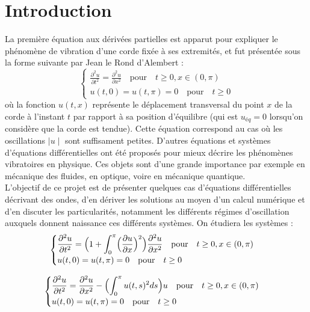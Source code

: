\documentclass[10pt,a4paper]{article}
\begin{document}
\section{Introduction}
La première équation aux dérivées partielles est apparut pour expliquer le phénomène de vibration d'une corde fixée à ses extremités, et fut présentée sous la forme suivante par Jean le Rond d'Alembert :
\begin{equation} \label{Ondes} 
\begin{cases} 
\displaystyle \frac {\partial ^2 u } {\partial t ^2} = \frac {\partial ^2 u } {\partial x ^2}  \quad  \text{pour}\quad t\ge 0, x\in (0,\pi ) \\ u(t, 0)= u (t, \pi )= 0\quad  \text{pour} \quad t\ge 0
\end{cases} 
\end{equation} 
où la fonction $u(t, x)$ représente le déplacement transversal du point $x$ de la corde à l'instant $t$ par rapport à sa position d'équilibre (qui est $u_{éq} = 0$ lorsqu'on considère que la corde est tendue). Cette équation correspond au cas où les oscillations $\mid u\mid$ sont suffisament petites.
D'autres équations et systèmes d'équations différentielles ont été proposés pour mieux décrire les phénomènes vibratoires en physique. Ces objets sont d'une grande importance par exemple en mécanique des fluides, en optique, voire en mécanique quantique.\\
L'objectif de ce projet est de présenter quelques cas d'équations différentielles décrivant des ondes, d'en dériver les solutions au moyen d'un calcul numérique et d'en discuter les particularités, notamment les différents régimes d'oscillation auxquels donnent naissance ces différents systèmes.
On étudiera les systèmes :
\begin{equation} \label{KC} 
\begin{cases} 
\displaystyle \frac {\partial ^2 u } {\partial t ^2} =  \Bigl( 1+ \int _0^\pi  \Bigl( \frac {\partial u} {\partial x} \Bigr)^2 \Bigr) \frac {\partial ^2 u } {\partial x ^2} \quad  \text{pour}\quad t\ge 0, x\in (0,\pi ) \\ u(t, 0)= u (t, \pi )= 0\quad  \text{pour} \quad t\ge 0
\end{cases} 
\end{equation} 



\begin{equation} \label{CHW} 
\begin{cases} 
\displaystyle \frac {\partial ^2 u } {\partial t ^2} = \frac {\partial ^2 u } {\partial x ^2} -  \Bigl( \int _0^\pi u(t,s)^2 ds \Bigr) u \quad  \text{pour}\quad t\ge 0, x\in (0,\pi ) \\ u(t, 0)= u (t, \pi )= 0\quad  \text{pour} \quad t\ge 0
\end{cases} 
\end{equation} 
\end{document}
